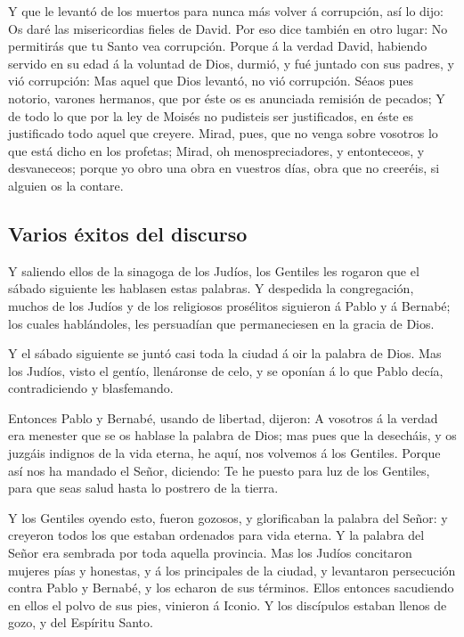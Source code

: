 Y que le levantó de los muertos para nunca más volver á
corrupción, así lo dijo: Os daré las misericordias fieles de David.
 Por eso dice también en otro lugar: No permitirás que tu
Santo vea corrupción.  Porque á la verdad David, habiendo
servido en su edad á la voluntad de Dios, durmió, y fué juntado con sus
padres, y vió corrupción:  Mas aquel que Dios levantó, no
vió corrupción.  Séaos pues notorio, varones hermanos,
que por éste os es anunciada remisión de pecados;  Y de
todo lo que por la ley de Moisés no pudisteis ser justificados, en éste
es justificado todo aquel que creyere.  Mirad, pues, que
no venga sobre vosotros lo que está dicho en los profetas;
 Mirad, oh menospreciadores, y entonteceos, y
desvaneceos; porque yo obro una obra en vuestros días, obra que no
creeréis, si alguien os la contare.

\hypertarget{varios-uxe9xitos-del-discurso}{%
\subsection{Varios éxitos del
discurso}\label{varios-uxe9xitos-del-discurso}}

 Y saliendo ellos de la sinagoga de los Judíos, los
Gentiles les rogaron que el sábado siguiente les hablasen estas
palabras.  Y despedida la congregación, muchos de los
Judíos y de los religiosos prosélitos siguieron á Pablo y á Bernabé; los
cuales hablándoles, les persuadían que permaneciesen en la gracia de
Dios.

 Y el sábado siguiente se juntó casi toda la ciudad á oir
la palabra de Dios.  Mas los Judíos, visto el gentío,
llenáronse de celo, y se oponían á lo que Pablo decía, contradiciendo y
blasfemando.

 Entonces Pablo y Bernabé, usando de libertad, dijeron: A
vosotros á la verdad era menester que se os hablase la palabra de Dios;
mas pues que la desecháis, y os juzgáis indignos de la vida eterna, he
aquí, nos volvemos á los Gentiles.  Porque así nos ha
mandado el Señor, diciendo: Te he puesto para luz de los Gentiles, para
que seas salud hasta lo postrero de la tierra.

 Y los Gentiles oyendo esto, fueron gozosos, y
glorificaban la palabra del Señor: y creyeron todos los que estaban
ordenados para vida eterna.  Y la palabra del Señor era
sembrada por toda aquella provincia.  Mas los Judíos
concitaron mujeres pías y honestas, y á los principales de la ciudad, y
levantaron persecución contra Pablo y Bernabé, y los echaron de sus
términos.  Ellos entonces sacudiendo en ellos el polvo de
sus pies, vinieron á Iconio.  Y los discípulos estaban
llenos de gozo, y del Espíritu Santo.


